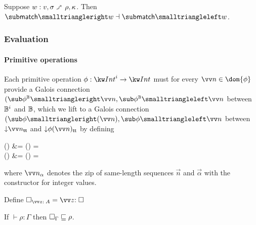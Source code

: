 \begin{theorem}
\label{thm:core-language:match:gc}
   Suppose $w: v, \sigma \matchFwdS \rho, \kappa$.  Then $\matchFwdF{w} \adjoint \matchBwdF{w}$.
\end{theorem}

\subsubsection{Evaluation}

\paragraph{Primitive operations}

Each primitive operation $\phi: \tyInt^{i} \to \tyInt$ must for every $\vec{n} \in \dom{\phi}$ provide a Galois connection $(\primFwdBool{\phi}{\vec{n}}, \primBwdBool{\phi}{\vec{n}}$ between $\mathbb{B}^i$ and $\mathbb{B}$, which we lift to a Galois connection $(\primFwd{\phi}(\vec{n}), \primBwd{\phi}{\vec{n}}$ between $\Below{\vec{\annInt{n}{\TT}}}$ and $\Below{\annInt{\phi(\vec{n})}{\TT}}$ by defining
\begin{definition}
\label{def:core-language:primop-gc}
\begin{salign}
   () &= 
   (\vec{\alpha}) = \beta
   \\
   () &= 
   (\beta) = \vec{\alpha}
\end{salign}
\end{definition}

\noindent where $\vec{\annInt{n}{\alpha}}$ denotes the zip of same-length sequences $\vec{n}$ and $\vec{\alpha}$ with the constructor for integer values.





\begin{definition}
Define $\hole_{\vec{\bind{z}{A}}} = \vec{\bind{z}{\hole}}$
\end{definition}

\begin{lemma}
\label{lem:core-language:hole-env}If $\vdash \rho: \Gamma$ then $\square_{\Gamma} \sqsubseteq \rho$.
\end{lemma}

